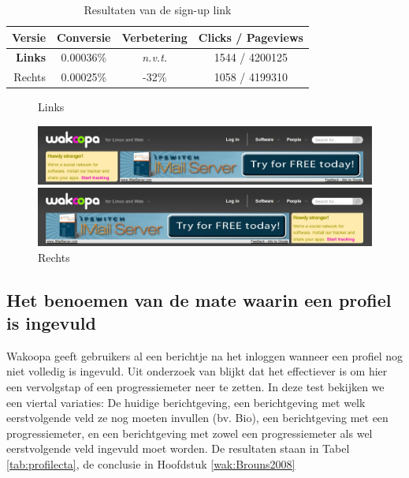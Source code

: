 \documentclass[a4paper, 10pt, pdftex]{report}
\begin{document}
        \begin{table}[ht]
        \centering
        \caption{Resultaten van de sign-up link}
        \begin{tabular}{r|*{3}{c}}
          \textbf{Versie}  & Conversie  & Verbetering & Clicks / Pageviews \\ \hline
          \textbf{Links}   & 0.00036\%  & \emph{n.v.t.}        & 1544 / 4200125 \\
          Rechts  & 0.00025\%  & -32\%                & 1058 / 4199310 \\
        \end{tabular}

        \label{tab:signupcta}
        \end{table}
    \begin{figure}
      \caption{Links}
      \includegraphics[width=\textwidth]{../images/abtest/left}
      \caption{Rechts}
      \includegraphics[width=\textwidth]{../images/abtest/right}
    \end{figure}

    \subsection{Het benoemen van de mate waarin een profiel is ingevuld}
      \label{profileprogress}
      Wakoopa geeft gebruikers al een berichtje na het inloggen wanneer een profiel nog niet volledig is ingevuld. Uit onderzoek van \cite{Brouns2008} blijkt dat het effectiever is om hier een vervolgstap of een progressiemeter neer te zetten. In deze test bekijken we een viertal variaties: De huidige berichtgeving, een berichtgeving met welk eerstvolgende veld ze nog moeten invullen (bv. Bio), een berichtgeving met een progressiemeter, en een berichtgeving met zowel een progressiemeter als wel eerstvolgende veld ingevuld moet worden.  De resultaten staan in Tabel \ref{tab:profilecta}, de conclusie in Hoofdstuk \ref{wak:Brouns2008}
\end{document}
